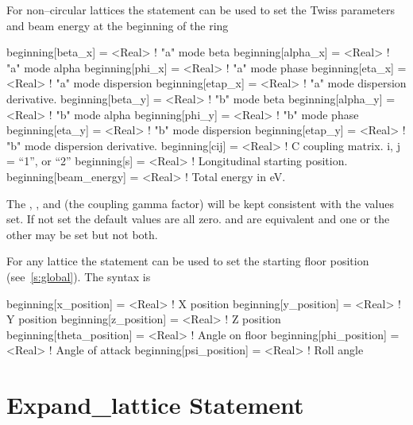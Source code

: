 For non--circular lattices the  statement can be used to
set the Twiss parameters and beam energy at the beginning of the ring
\begin{example}
  beginning[beta_x]  = <Real>  ! "a" mode beta
  beginning[alpha_x] = <Real>  ! "a" mode alpha
  beginning[phi_x]   = <Real>  ! "a" mode phase
  beginning[eta_x]   = <Real>  ! "a" mode dispersion
  beginning[etap_x]  = <Real>  ! "a" mode dispersion derivative.
  beginning[beta_y]  = <Real>  ! "b" mode beta
  beginning[alpha_y] = <Real>  ! "b" mode alpha
  beginning[phi_y]   = <Real>  ! "b" mode phase
  beginning[eta_y]   = <Real>  ! "b" mode dispersion
  beginning[etap_y]  = <Real>  ! "b" mode dispersion derivative.
  beginning[cij]     = <Real>  ! C coupling matrix. i, j = {``1'', or ``2''} 
  beginning[s]       = <Real>  ! Longitudinal starting position.
  beginning[beam_energy] = <Real>  ! Total energy in eV.
\end{example}
The , , and  (the coupling gamma
factor) will be kept consistent with the values set. If not set the
default values are all zero.   and
 are equivalent and one or the other may be
set but not both.

For any lattice the  statement can be used to set the starting floor position 
(see~\ref{s:global}). The syntax is
\begin{example}
  beginning[x_position]     = <Real>  ! X position
  beginning[y_position]     = <Real>  ! Y position
  beginning[z_position]     = <Real>  ! Z position
  beginning[theta_position] = <Real>  ! Angle on floor
  beginning[phi_position]   = <Real>  ! Angle of attack
  beginning[psi_position]   = <Real>  ! Roll angle
\end{example}

\section{Expand\_lattice Statement}
\label{s:lat_expand}

